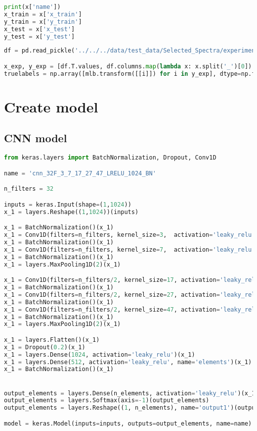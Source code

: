 \begin{lstlisting}[language=Python]
print(x['name'])
x_train = x['x_train']
y_train = x['y_train']
x_test = x['x_test']
y_test = x['y_test']
\end{lstlisting}

\begin{lstlisting}[language=Python]
df = pd.read_pickle('../../../data/test_data/Selected_Spectra/experimental_data_elemental.pkl')

x_exp, y_exp = [df.T.values, df.columns.map(lambda x: x.split('_')[0]).values] # top layer
truelabels = np.array([mlb.transform([[i]]) for i in y_exp], dtype=np.float32)
\end{lstlisting}

\hypertarget{create-model}{%
\section{Create model}\label{create-model}}

\hypertarget{cnn-model}{%
\subsection{CNN model}\label{cnn-model}}

\begin{lstlisting}[language=Python]
from keras.layers import BatchNormalization, Dropout, Conv1D

name = 'cnn_32F_3_7_17_27_47_LRELU_1024_BN'

n_filters = 32

inputs = keras.Input(shape=(1,1024))
x_1 = layers.Reshape((1,1024))(inputs)

x_1 = BatchNormalization()(x_1)
x_1 = Conv1D(filters=n_filters, kernel_size=3,  activation='leaky_relu', data_format='channels_first')(x_1)
x_1 = BatchNormalization()(x_1)
x_1 = Conv1D(filters=n_filters, kernel_size=7,  activation='leaky_relu', data_format='channels_first')(x_1)
x_1 = BatchNormalization()(x_1)
x_1 = layers.MaxPooling1D(2)(x_1)

x_1 = Conv1D(filters=n_filters/2, kernel_size=17, activation='leaky_relu', data_format='channels_first')(x_1)
x_1 = BatchNormalization()(x_1)
x_1 = Conv1D(filters=n_filters/2, kernel_size=27, activation='leaky_relu', data_format='channels_first')(x_1)
x_1 = BatchNormalization()(x_1)
x_1 = Conv1D(filters=n_filters/2, kernel_size=47, activation='leaky_relu', data_format='channels_first')(x_1)
x_1 = BatchNormalization()(x_1)
x_1 = layers.MaxPooling1D(2)(x_1)

x_1 = layers.Flatten()(x_1)
x_1 = Dropout(0.2)(x_1)
x_1 = layers.Dense(1024, activation='leaky_relu')(x_1)
x_1 = layers.Dense(512, activation='leaky_relu', name='elements')(x_1)
x_1 = BatchNormalization()(x_1)


output_elements = layers.Dense(n_elements, activation='leaky_relu')(x_1)
output_elements = layers.Softmax(axis=-1)(output_elements)
output_elements = layers.Reshape((1, n_elements), name='output1')(output_elements)

model = keras.Model(inputs=inputs, outputs=output_elements, name=name)
\end{lstlisting}

